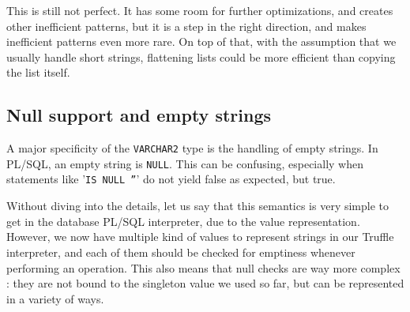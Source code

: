 \documentclass[twoside,11pt,a4paper]{article}
\newcommand{\pls}[1]{\texttt{#1}}
\newcommand{\plstype}[1]{\pls{#1}}
\newcommand{\varchar}{\plstype{VARCHAR2}}
\newcommand{\plsnull}{\pls{NULL}}
\begin{document}
This is still not perfect. It has some room for further optimizations, and creates other inefficient patterns, but it is a step in the right direction, and makes inefficient patterns even more rare. On top of that, with the assumption that we usually handle short strings, flattening lists could be more efficient than copying the list itself.

\subsection{Null support and empty strings}


A major specificity of the \varchar{} type is the handling of empty strings. In PL/SQL, an empty string is \plsnull{}. This can be confusing, especially when statements like '\pls{IS NULL ''}' do not yield false as expected, but true.

Without diving into the details, let us say that this semantics is very simple to get in the database PL/SQL interpreter, due to the value representation. However, we now have multiple kind of values to represent strings in our Truffle interpreter, and each of them should be checked for emptiness whenever performing an operation. This also means that null checks are way more complex : they are not bound to the singleton value we used so far, but can be represented in a variety of ways.
\end{document}
